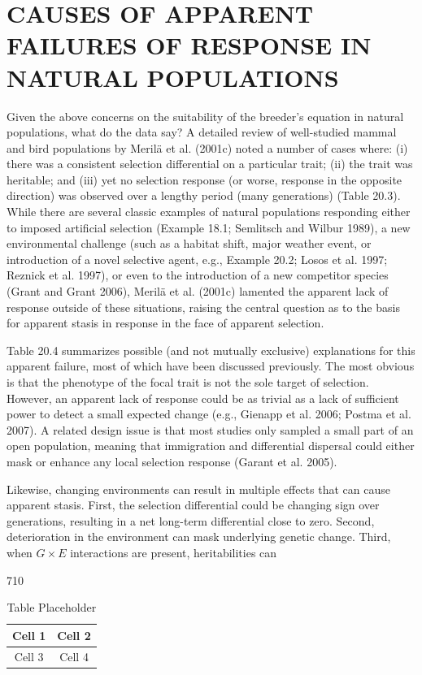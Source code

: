 \documentclass{article}
\begin{document}
\section{CAUSES OF APPARENT FAILURES OF RESPONSE IN NATURAL POPULATIONS}
Given the above concerns on the suitability of the breeder’s equation in natural populations, what do the data say? A detailed review of well-studied mammal and bird populations by Merilä et al. (2001c) noted a number of cases where: (i) there was a consistent selection differential on a particular trait; (ii) the trait was heritable; and (iii) yet no selection response (or worse, response in the opposite direction) was observed over a lengthy period (many generations) (Table 20.3). While there are several classic examples of natural populations responding either to imposed artificial selection (Example 18.1; Semlitsch and Wilbur 1989), a new environmental challenge (such as a habitat shift, major weather event, or introduction of a novel selective agent, e.g., Example 20.2; Losos et al. 1997; Reznick et al. 1997), or even to the introduction of a new competitor species (Grant and Grant 2006), Merilä et al. (2001c) lamented the apparent lack of response outside of these situations, raising the central question as to the basis for apparent stasis in response in the face of apparent selection.

Table 20.4 summarizes possible (and not mutually exclusive) explanations for this apparent failure, most of which have been discussed previously. The most obvious is that the phenotype of the focal trait is not the sole target of selection. However, an apparent lack of response could be as trivial as a lack of sufficient power to detect a small expected change (e.g., Gienapp et al. 2006; Postma et al. 2007). A related design issue is that most studies only sampled a small part of an open population, meaning that immigration and differential dispersal could either mask or enhance any local selection response (Garant et al. 2005).

Likewise, changing environments can result in multiple effects that can cause apparent stasis. First, the selection differential could be changing sign over generations, resulting in a net long-term differential close to zero. Second, deterioration in the environment can mask underlying genetic change. Third, when  $ G \times E $ interactions are present, heritabilities can

710

\begin{table}[h]
\centering
\begin{tabular}{|c|c|}
\hline
Cell 1 & Cell 2 \\
\hline
Cell 3 & Cell 4 \\
\hline
\end{tabular}
\caption{Table Placeholder}
\end{table}
\end{document}
